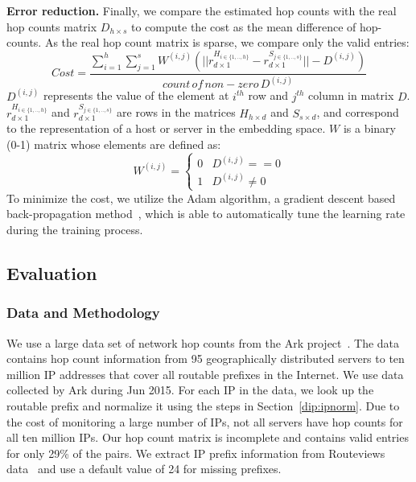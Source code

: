 \textbf{Error reduction.} Finally, we compare the estimated hop counts with the real hop counts matrix $D_{h\times s}$ to compute the cost as the mean difference of hop-counts. 
As the real hop count matrix is sparse, we compare only the valid entries:
\begin{equation} 
\label{equ:cost} 
Cost = \frac{\sum_{i=1}^{h} \sum_{j=1}^{s}W^{(i,j)}(||r^{H_{i\in{\{1,..,h\}}}}_{d\times1} - r^{S_{j\in{\{1,..,s\}}}}_{d\times1}|| - D^{(i,j)})}{count\, of\, non-zero\, D^{(i,j)}} 
\end{equation}
$D^{(i,j)}$ represents the value of the element at $i^{th}$ row  and $j^{th}$ column in matrix $D$. $r^{H_{i\in{\{1,..,h\}}}}_{d\times1}$ and $r^{S_{j\in{\{1,..,s\}}}}_{d\times1}$ are rows in the matrices $H_{h\times d}$ and $S_{s\times d}$, and correspond to the representation of a host or server in the embedding space. $W$ is a binary (0-1) matrix whose elements are defined as:
\begin{equation}    W^{(i,j)} =
\begin{cases}
0   &  \text{$D^{(i,j)} == 0 $} \\
1    &  \text{$D^{(i,j)} \neq 0$ } 
\end{cases}                \end{equation}
To minimize the cost, we utilize the Adam algorithm, a gradient descent based back-propagation method~\citep{kingma2014adam}, which is able to automatically tune the learning rate during the training process.


\subsection{Evaluation}
\label{dip:eval}

\subsubsection{Data and Methodology}
\label{subsec:data}

We use a large data set of network hop counts from the Ark project~\citep{ark}. The data contains hop count information from 95 geographically distributed servers to ten million IP addresses that cover all routable prefixes in the Internet. We use data collected by Ark during Jun 2015. For each IP in the data, we look up the routable prefix and normalize it using the steps in Section~\ref{dip:ipnorm}.
%
Due to the cost of monitoring a large number of IPs, not all servers have hop counts for all ten million IPs. Our hop count matrix is incomplete and contains valid entries for only 29\% of the pairs. We extract IP prefix information from Routeviews data~\citep{routeviews} and use a default value of 24 for missing prefixes.


